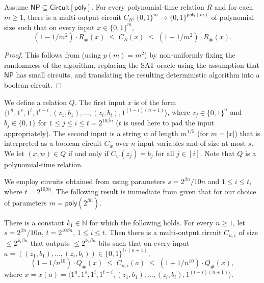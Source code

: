 \documentclass{toc}
\begin{document}
\begin{corollary}\label{c:counting_circuits}
Assume $\mathsf{NP} \subseteq \mathsf{Circuit}[\mathsf{poly}]$. For every polynomial-time relation $R$ and for each $m \geq 1$, there is a multi-output circuit $C_R \colon \{0,1\}^m \to \{0,1\}^{\mathsf{poly}(m)}$ of polynomial size such that on every input $x \in \{0,1\}^m$,
$$
(1 - 1/m^2) \cdot R_{\#}(x) \;\leq\; C_R(x) \;\leq\; (1 + 1/m^2) \cdot R_{\#}(x).
$$ 
\end{corollary}

\begin{proof}
This follows from  (using $p(m) = m^2$) by non-uniformly fixing the randomness of the algorithm, replacing the SAT oracle using the assumption that $\mathsf{NP}$ has small circuits, and translating the resulting deterministic algorithm into a boolean circuit.
\end{proof}

We define a relation $Q$. The first input $x$ is of the form $\langle 1^n, 1^s, 1^{i}, 1^{t-i}, (z_1, b_1), \ldots, (z_{i}, b_{i}), 1^{(t-i)(n+1)} \rangle$, where $z_j \in \{0,1\}^n$ and $b_j \in \{0,1\}$ for $1 \leq j \leq i\le t = 2^{10\beta n}$ ($t$ is used here to pad the input appropriately). The second input is a string $w$ of length $m^{1/5}$ (for $m = |x|$) that is interpreted as a boolean circuit $C_w$ over $n$ input variables and of size at most $s$. We let $(x,w) \in Q$ if and only if $C_w(z_j) = b_j$ for all $j \in [i]$. Note that $Q$ is a polynomial-time relation.

We employ circuits obtained from  using parameters $s = 2^{\beta n}/10n$ and $1 \leq i \leq t$, where $t = 2^{10\beta n}$. The following result is immediate from  given that for our choice of parameters $m = \mathsf{poly}(2^{\beta n})$.

\begin{proposition}\label{p:circuis_for_counting}
There is a constant $k_1 \in \mathbb{N}$ for which the following holds. For every $n \geq 1$, let $s = 2^{\beta n}/10n$, $t = 2^{10\beta n}$,  $1 \leq i \leq t$. Then there is a multi-output circuit $C_{n,i}$ of size $\leq 2^{k_1 \beta n}$ that outputs $\leq 2^{k_1 \beta n}$ bits such that on every input $a = ((z_1, b_1), \ldots, (z_{i}, b_{i})) \in \{0,1\}^{i \cdot(n + 1)}$,
$$
(1 - 1/n^{10}) \cdot Q_{\#}(x) \;\leq\; C_{n,i}(a) \;\leq\; (1 + 1/n^{10}) \cdot Q_{\#}(x),
$$
where $x = x(a)=\langle 1^n, 1^s, 1^{i}, 1^{t-i}, (z_1, b_1), \ldots, (z_{i}, b_{i}), 1^{(t-i)(n+1)} \rangle$.
\end{proposition}
\end{document}
